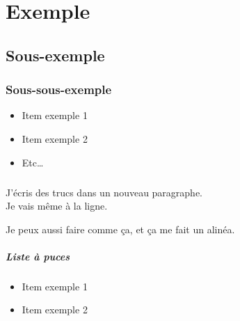 \chapter{Exemple}
    \section{Sous-exemple}

\lipsum[1-2]

    \subsection{Sous-sous-exemple}

\begin{itemize}
    \item Item exemple 1
    \item Item exemple 2
    \item Etc\ldots
\end{itemize}

\paragraph{}
J'écris des trucs dans un nouveau paragraphe.\\
Je vais même à la ligne.

Je peux aussi faire comme ça, et ça me fait un alinéa.

\paragraph{Liste à puces}
\begin{itemize}[label=\textbullet]
    \item Item exemple 1
    \item Item exemple 2
\end{itemize}

